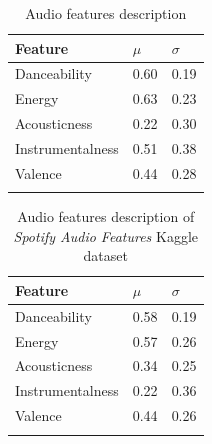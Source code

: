 \documentclass[sn-mathphys]{sn-jnl}%
\theoremstyle{thmstyleone}%
\theoremstyle{thmstyletwo}%
\theoremstyle{thmstylethree}%
\begin{document}

\begin{table}[h!]
      \begin{center}
      \begin{minipage}{\textwidth}
      \caption{Audio features description}\label{table:audio-features-stats}%
      \begin{tabular}{@{}lll@{}}
      \toprule
      Feature           & $\mu$ & $\sigma$ \\
      \midrule
      Danceability      & 0.60  & 0.19  \\
      Energy            & 0.63  & 0.23  \\
      Acousticness      & 0.22  & 0.30  \\
      Instrumentalness  & 0.51  & 0.38  \\
      Valence           & 0.44  & 0.28  \\
      \botrule
      \end{tabular}
      \end{minipage}
      \end{center}
\end{table}
\begin{table}[h!]
      \begin{center}
      \begin{minipage}{\textwidth}
      \caption{Audio features description of \emph{Spotify Audio Features} Kaggle dataset}\label{table:audio-features-stats-kaggle}%
      \begin{tabular}{@{}lll@{}}
      \toprule
      Feature           & $\mu$ & $\sigma$ \\
      \midrule
      Danceability      & 0.58   & 0.19  \\
      Energy            & 0.57  & 0.26  \\
      Acousticness      & 0.34  & 0.25  \\
      Instrumentalness  & 0.22  & 0.36  \\
      Valence           & 0.44  & 0.26  \\
      \botrule
      \end{tabular}
      \end{minipage}
      \end{center}
\end{table}
\end{document}

